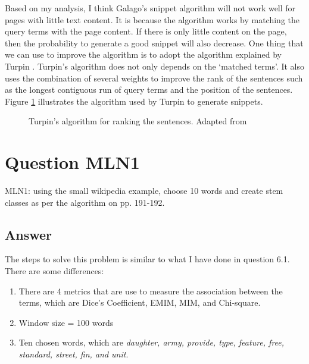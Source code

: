 \documentclass[letterpaper,11pt]{article}
\begin{document}
Based on my analysis, I think Galago's snippet algorithm will not work well for pages with little text content. It is because the algorithm works by matching the query terms with the page content. If there is only little content on the page, then the probability to generate a good snippet will also decrease. 
One thing that we can use to improve the algorithm is to adopt the algorithm explained by Turpin \cite{Turpin:2007:FGR:1277741.1277766}. Turpin's algorithm does not only depends on the `matched terms'. It also uses the combination of several weights to improve the rank of the sentences such as the longest contiguous run of query terms and the position of the sentences. Figure \ref{fig:sentence_rank} illustrates the algorithm used by Turpin \cite{Turpin:2007:FGR:1277741.1277766} to generate snippets. 

\begin{figure}[H]
	\centering
	\caption{Turpin's algorithm for ranking the sentences. Adapted from \cite{Turpin:2007:FGR:1277741.1277766}}
	\label{fig:sentence_rank}
\end{figure}

\noindent\makebox[\linewidth]{\rule{\textwidth}{0.4pt}}

\section*{Question MLN1}
\begin{spverbatim}
MLN1: using the small wikipedia example, choose 10 words and create stem classes as per the algorithm on pp. 191-192.
\end{spverbatim}

\subsection*{Answer}

The steps to solve this problem is similar to what I have done in question 6.1. There are some differences:
\begin{enumerate}
\item There are 4 metrics that are use to measure the association between the terms, which are Dice's Coefficient, EMIM, MIM, and Chi-square. 
\item Window size = 100 words
\item Ten chosen words, which are \textit{daughter, army, provide, type, feature, free, standard, street, fin, and unit}. 
\end{enumerate}
\end{document}

